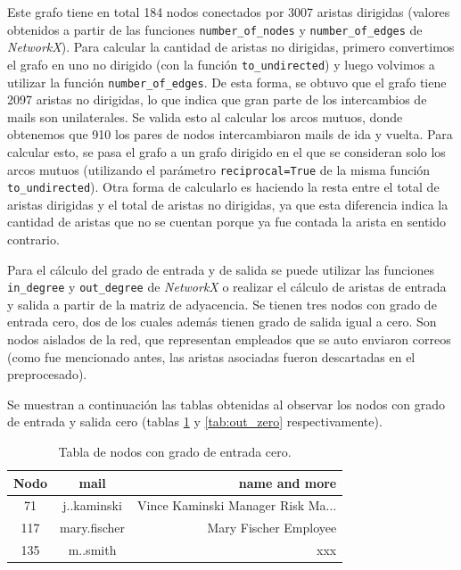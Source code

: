 \documentclass{article}
\begin{document}
Este grafo tiene en total 184 nodos conectados por 3007 aristas dirigidas (valores obtenidos a partir de las funciones \verb|number_of_nodes| y \verb|number_of_edges| de \textit{NetworkX}). Para calcular la cantidad de aristas no dirigidas, primero convertimos el grafo en uno no dirigido (con la función \verb|to_undirected|) y luego volvimos a utilizar la función \verb|number_of_edges|. De esta forma, se obtuvo que el grafo tiene 2097 aristas no dirigidas, lo que indica que gran parte de los intercambios de mails son unilaterales. Se valida esto al calcular los arcos mutuos, donde obtenemos que 910 los pares de nodos intercambiaron mails de ida y vuelta. Para calcular esto, se pasa el grafo a un grafo dirigido en el que se consideran solo los arcos mutuos (utilizando el parámetro \verb|reciprocal=True| de la misma función \verb|to_undirected|). Otra forma de calcularlo es haciendo la resta entre el total de aristas dirigidas y el total de aristas no dirigidas, ya que esta diferencia indica la cantidad de aristas que no se cuentan porque ya fue contada la arista en sentido contrario.

Para el cálculo del grado de entrada y de salida se puede utilizar las funciones \verb|in_degree| y \verb|out_degree| de \textit{NetworkX} o realizar el cálculo de aristas de entrada y salida a partir de la matriz de adyacencia. Se tienen tres nodos con grado de entrada cero, dos de los cuales además tienen grado de salida igual a cero. Son nodos aislados de la red, que representan empleados que se auto enviaron correos (como fue mencionado antes, las aristas asociadas fueron descartadas en el preprocesado).

Se muestran a continuación las tablas obtenidas al observar los nodos con grado de entrada y salida cero (tablas \ref{tab:in_zero} y \ref{tab:out_zero} respectivamente).

\begin{table}[htb]
    \centering
    \begin{tabular}{|c|c|r|}
        \hline
        \textbf{Nodo} & \textbf{mail} & \textbf{name and more} \\
        \hline
        71 & j..kaminski & Vince Kaminski Manager Risk Ma... \\
        117 & mary.fischer & Mary Fischer Employee \\
        135 & m..smith & xxx \\
        \hline
    \end{tabular}
    \caption{Tabla de nodos con grado de entrada cero.}
    \label{tab:in_zero}
\end{table}
\end{document}
